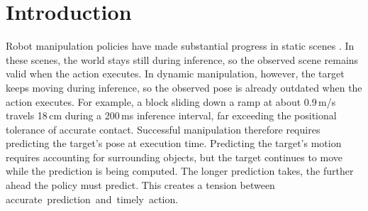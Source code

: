 \section{Introduction}
\label{sec:introduction}


Robot manipulation policies have made substantial progress in static scenes \cite{diffusionpolicy,pi05}.
In these scenes, the world stays still during inference, so the observed scene remains valid when the action executes.
In dynamic manipulation, however, the target keeps moving during inference, so the observed pose is already outdated when the action executes. 
For example, a block sliding down a ramp at about 0.9\,m/s travels 18\,cm during a 200\,ms inference interval, far exceeding the positional tolerance of accurate contact.
Successful manipulation therefore requires predicting the target's pose at execution time. %
Predicting the target’s motion requires accounting for surrounding objects, but the target continues to move while the prediction is being computed. The longer prediction takes, the further ahead the policy must predict.
This creates a tension between \mbox{accurate prediction and timely action.}


